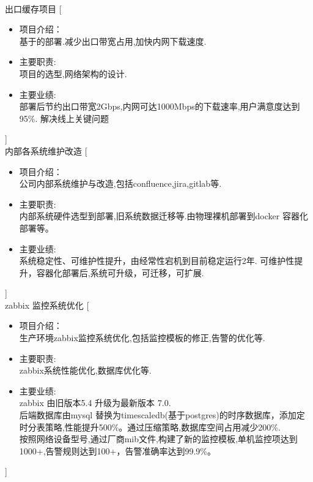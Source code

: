 \documentclass[zh]{resume}
\begin{document}
\begin{experiences}
  \\
  {出口缓存项目}%
  [\begin{itemize}
    \item 项目介绍：\\
    基于的部署.减少出口带宽占用,加快内网下载速度.
    \item 主要职责: \\
    项目的选型,网络架构的设计. 
    \item 主要业绩: \\
    部署后节约出口带宽2Gbps,内网可达1000Mbps的下载速率,用户满意度达到95\%. 解决线上关键问题
  \end{itemize}]
  \\
  {内部各系统维护改造}%
  [\begin{itemize}
    \item 项目介绍：\\
    公司内部系统维护与改造,包括confluence,jira,gitlab等.
    \item 主要职责: \\
    内部系统硬件选型到部署,旧系统数据迁移等.由物理裸机部署到docker 容器化部署等。
    \item 主要业绩: \\
    系统稳定性、可维护性提升，由经常性宕机到目前稳定运行2年. 可维护性提升，容器化部署后,系统可升级，可迁移，可扩展.
  \end{itemize}]
  \\
  {zabbix 监控系统优化}%
  [\begin{itemize}
    \item 项目介绍：\\
    生产环境zabbix监控系统优化,包括监控模板的修正,告警的优化等.
    \item 主要职责: \\
    zabbix系统性能优化,数据库优化等.
    \item 主要业绩: \\
    zabbix 由旧版本5.4 升级为最新版本 7.0.\\
    后端数据库由mysql 替换为timescaledb(基于postgres)的时序数据库，添加定时分表策略,性能提升500\%。通过压缩策略,数据库空间占用减少200\%. \\
    按照网络设备型号,通过厂商mib文件,构建了新的监控模板,单机监控项达到1000+,告警规则达到100+，告警准确率达到99.9\%。
  \end{itemize}]

\end{experiences}
\end{document}
